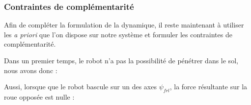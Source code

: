 					
			\subsubsection{Contraintes de complémentarité}
			
				Afin de compléter la formulation de la dynamique, il reste maintenant à utiliser les \textit{a priori} que l'on dispose sur notre système et formuler les contraintes de complémentarité.
				
				Dans un premier temps, le robot n'a pas la possibilité de pénétrer dans le sol, nous avons donc :
				
				Aussi, lorsque que le robot bascule sur un des axes $\psi_{frl}$, la force résultante sur la roue opposée est nulle :
				
